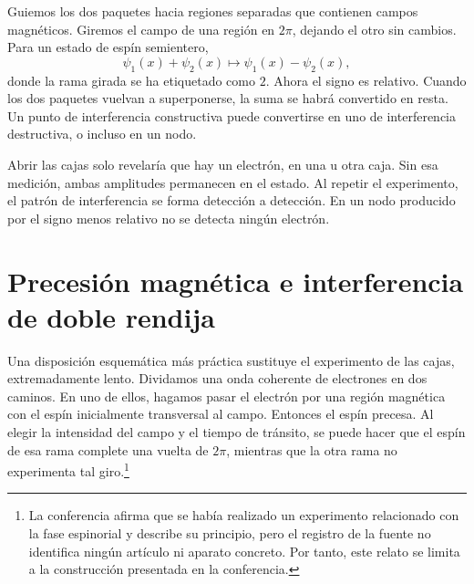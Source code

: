 Guiemos los dos paquetes hacia regiones separadas que contienen campos magnéticos. Giremos el campo de una región en \(2\pi\), dejando el otro sin cambios. Para un estado de espín semientero,
\begin{equation}
\psi_1(x)+\psi_2(x)
\longmapsto
\psi_1(x)-\psi_2(x),
\end{equation}
donde la rama girada se ha etiquetado como \(2\). Ahora el signo es relativo. Cuando los dos paquetes vuelvan a superponerse, la suma se habrá convertido en resta. Un punto de interferencia constructiva puede convertirse en uno de interferencia destructiva, o incluso en un nodo.

\begin{classroomqa}
\end{classroomqa}

Abrir las cajas solo revelaría que hay un electrón, en una u otra caja. Sin esa medición, ambas amplitudes permanecen en el estado. Al repetir el experimento, el patrón de interferencia se forma detección a detección. En un nodo producido por el signo menos relativo no se detecta ningún electrón.

\section{Precesión magnética e interferencia de doble rendija}

Una disposición esquemática más práctica sustituye el experimento de las cajas, extremadamente lento. Dividamos una onda coherente de electrones en dos caminos. En uno de ellos, hagamos pasar el electrón por una región magnética con el espín inicialmente transversal al campo. Entonces el espín precesa. Al elegir la intensidad del campo y el tiempo de tránsito, se puede hacer que el espín de esa rama complete una vuelta de \(2\pi\), mientras que la otra rama no experimenta tal giro.\footnote{La conferencia afirma que se había realizado un experimento relacionado con la fase espinorial y describe su principio, pero el registro de la fuente no identifica ningún artículo ni aparato concreto. Por tanto, este relato se limita a la construcción presentada en la conferencia.}

